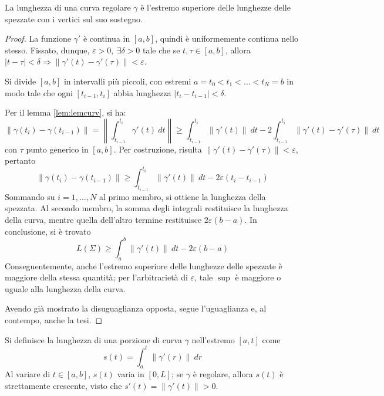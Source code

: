 \documentclass[11pt, a4paper]{scrartcl}
\theoremstyle{definition}
\numberwithin{esempio}{section}
\theoremstyle{definition}
\numberwithin{obs}{section}
\numberwithin{nota}{section}
\numberwithin{equation}{subsection}
\begin{document}
\begin{teorema}
	{}{}
	La lunghezza di una curva regolare $\gamma$ \`e l'estremo superiore delle lunghezze delle spezzate con i vertici sul suo sostegno.
	\begin{proof}
		La funzione $\gamma'$ \`e continua in $\left[ a,b \right] $, quindi \`e uniformemente continua nello stesso.
		Fissato, dunque, $\varepsilon >0, \ \exists \delta >0 $ tale che se $t, \tau \in \left[ a,b \right] $, allora $\lvert t-\tau  \rvert <\delta \Rightarrow \left\lVert \gamma'(t) - \gamma'(\tau )   \right\rVert < \varepsilon $.

		Si divide $\left[ a,b \right] $ in intervalli pi\`u piccoli, con estremi $a = t_0 < t_1 < \ldots < t_N = b$ in modo tale che ogni $\left[ t_{i-1} ,t_i \right] $ abbia lunghezza $\lvert t_i - t_{i-1}  \rvert < \delta $.

		Per il lemma \ref{lem:lemcurv}, si ha:
		\[
		\left\lVert \gamma(t_i) - \gamma(t_{i-1} ) \right\rVert  = \left\lVert \int_{t_{i-1} } ^{t_i} \gamma'(t) \ dt  \right\rVert \ge  \int_{t_{i-1} } ^{t_i} \left\lVert \gamma'(t) \right\rVert  \ dt - 2 \int_{t_{i-1} } ^{t_i} \left\lVert \gamma'(t) - \gamma'(\tau ) \right\rVert \ dt
		\] 
		con $\tau $ punto generico in $\left[ a,b \right] $.
		Per costruzione, risulta $\left\lVert \gamma'(t) - \gamma'( \tau ) \right\rVert < \varepsilon $, pertanto
		\[
		\left\lVert \gamma(t_i) - \gamma(t_{i-1})  \right\rVert \ge  \int_{t_{i-1} } ^{t_i} \left\lVert \gamma' (t) \right\rVert \ dt - 2 \varepsilon  ( t_i - t_{i-1} )
		\] 
	Sommando su $i= 1, \ldots, N$ al primo membro, si ottiene la lunghezza della spezzata.
	Al secondo membro, la somma degli integrali restituisce la lunghezza della curva, mentre quella dell'altro termine restituisce $2\varepsilon  (b-a)$. 
	In conclusione, si \`e trovato
	\[
	L(\Sigma) \ge  \int_{a} ^b \left\lVert \gamma'  (t)\right\rVert \ dt - 2\varepsilon (b-a)
	\] 
	Conseguentemente, anche l'estremo superiore delle lunghezze delle spezzate \`e maggiore della stessa quantit\`a; per l'arbitrariet\`a di $\varepsilon $, tale $\sup$ \`e maggiore o uguale alla lunghezza della curva. 

	Avendo gi\`a mostrato la disuguaglianza opposta, segue l'uguaglianza e, al contempo, anche la tesi.
	\end{proof}
\end{teorema}
Si definisce la lunghezza di una porzione di curva $\gamma$ nell'estremo $\left[ a,t \right] $ come
\[
s(t) = \int_{a} ^t \left\lVert \gamma'(r) \right\rVert \ dr
\] 
Al variare di $t \in \left[ a,b \right] $, $s(t)$ varia in $\left[ 0,L \right] $; se $\gamma$ \`e regolare, allora $s(t)$ \`e strettamente crescente, visto che $ s'(t) = \left\lVert \gamma'(t) \right\rVert > 0$.
\end{document}
